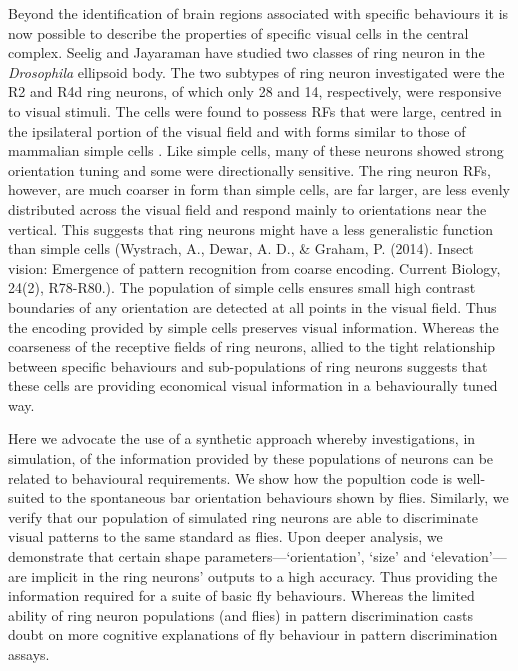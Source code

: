 Beyond the identification of brain regions associated with specific behaviours it is now possible to describe the properties of specific visual cells in the central complex. Seelig and Jayaraman \cite{Seelig2013} have studied two classes of ring neuron in the \emph{Drosophila} ellipsoid body.
The two subtypes of ring neuron investigated were the R2 and R4d ring neurons, of which only 28 and 14, respectively, were responsive to visual stimuli.
The cells were found to possess \acp{RF} that were large, centred in the ipsilateral portion of the visual field and with forms similar to those of mammalian simple cells \cite{Hubel1962}.
Like simple cells, many of these neurons showed strong orientation tuning and some were directionally sensitive.
The ring neuron \acp{RF}, however, are much coarser in form than simple cells, are far larger, are less evenly distributed across the visual field and respond mainly to orientations near the vertical.
This suggests that ring neurons might have a less generalistic function than simple cells (Wystrach, A., Dewar, A. D., \& Graham, P. (2014). Insect vision: Emergence of pattern recognition from coarse encoding. Current Biology, 24(2), R78-R80.). The population of simple cells ensures small high contrast boundaries of any orientation are detected at all points in the visual field. Thus the encoding provided by simple cells preserves visual information. Whereas the coarseness of the receptive fields of ring neurons, allied to the tight relationship between specific behaviours and sub-populations of ring neurons suggests that these cells are providing economical visual information in a behaviourally tuned way.

Here we advocate the use of a synthetic approach whereby investigations, in simulation, of the information provided by these populations of neurons can be related to behavioural requirements. We show how the popultion code is well-suited to the spontaneous bar orientation behaviours shown by flies. Similarly, we verify that our population of simulated ring neurons are able to discriminate visual patterns to the same standard as flies.
Upon deeper analysis, we demonstrate that certain shape parameters---`orientation', `size' and `elevation'---are implicit in the ring neurons' outputs to a high accuracy. Thus providing the information required for a suite of basic fly behaviours. Whereas the limited ability of ring neuron populations (and flies) in pattern discrimination casts doubt on more cognitive explanations of fly behaviour in pattern discrimination assays.
